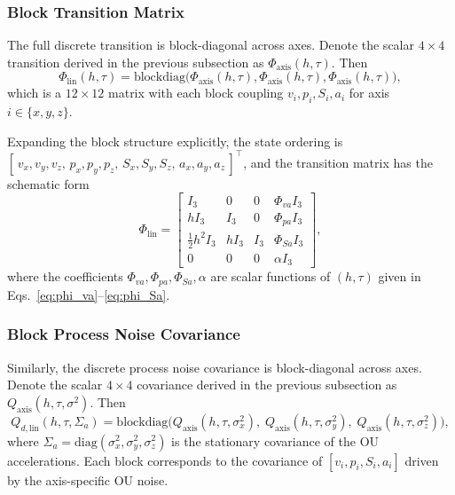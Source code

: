 \documentclass[10pt]{extarticle}
\begin{document}
\subsubsection{Block Transition Matrix}

The full discrete transition is block-diagonal across axes. Denote the
scalar $4\times 4$ transition derived in the previous subsection as
$\Phi_{\mathrm{axis}}(h,\tau)$. Then
%
\begin{equation}
\Phi_{\mathrm{lin}}(h,\tau) =
\mathrm{blockdiag}\bigl( \Phi_{\mathrm{axis}}(h,\tau),
\Phi_{\mathrm{axis}}(h,\tau),
\Phi_{\mathrm{axis}}(h,\tau) \bigr),
\label{eq:Phi_lin_block}
\end{equation}
%
which is a $12\times 12$ matrix with each block coupling
$v_i,p_i,S_i,a_i$ for axis $i\in\{x,y,z\}$.

Expanding the block structure explicitly, the state ordering is
$[\, v_x,v_y,v_z,\, p_x,p_y,p_z,\, S_x,S_y,S_z,\, a_x,a_y,a_z\,]^\top$,
and the transition matrix has the schematic form
%
\begin{equation}
\Phi_{\mathrm{lin}} =
\begin{bmatrix}
I_3 & 0   & 0   & \Phi_{va} I_3 \\
h I_3 & I_3 & 0   & \Phi_{pa} I_3 \\
\tfrac{1}{2}h^2 I_3 & h I_3 & I_3 & \Phi_{Sa} I_3 \\
0   & 0   & 0   & \alpha I_3
\end{bmatrix},
\end{equation}
%
where the coefficients $\Phi_{va}, \Phi_{pa}, \Phi_{Sa}, \alpha$
are scalar functions of $(h,\tau)$ given in
Eqs.~\eqref{eq:phi_va}--\eqref{eq:phi_Sa}.

\subsubsection{Block Process Noise Covariance}

Similarly, the discrete process noise covariance is block-diagonal across
axes. Denote the scalar $4\times 4$ covariance derived in the previous
subsection as $Q_{\mathrm{axis}}(h,\tau,\sigma^2)$. Then
%
\begin{equation}
Q_{d,\mathrm{lin}}(h,\tau,\Sigma_{\!a}) =
\mathrm{blockdiag}\bigl(
Q_{\mathrm{axis}}(h,\tau,\sigma_x^2),\;
Q_{\mathrm{axis}}(h,\tau,\sigma_y^2),\;
Q_{\mathrm{axis}}(h,\tau,\sigma_z^2)
\bigr),
\label{eq:Qd_lin_block}
\end{equation}
%
where $\Sigma_{\!a} = \mathrm{diag}(\sigma_x^2, \sigma_y^2, \sigma_z^2)$
is the stationary covariance of the OU accelerations.
Each block corresponds to the covariance of $[v_i,p_i,S_i,a_i]$ driven
by the axis-specific OU noise.
\end{document}
